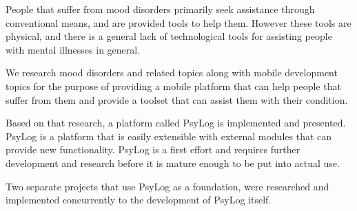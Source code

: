 People that suffer from mood disorders primarily seek assistance through conventional means, and are provided tools to help them.
However these tools are physical, and there is a general lack of technological tools for assisting people with mental illnesses in general.

We research mood disorders and related topics along with mobile development topics for the purpose of providing a mobile platform that can help people that suffer from them and provide a toolset that can assist them with their condition.

Based on that research, a platform called PsyLog is implemented and presented.
PsyLog is a platform that is easily extensible with external modules that can provide new functionality.
PsyLog is a first effort and requires further development and research before it is mature enough to be put into actual use.

Two separate projects that use PsyLog as a foundation, were researched and implemented concurrently to the development of PsyLog itself. 